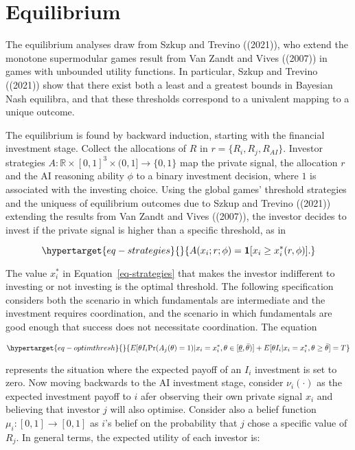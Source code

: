 \documentclass[
]{article}
\theoremstyle{plain}
\theoremstyle{definition}
\theoremstyle{remark}
\begin{document}
\hypertarget{equilibrium}{%
\section{Equilibrium}\label{equilibrium}}

The equilibrium analyses draw from Szkup and Trevino ((2021)), who
extend the monotone supermodular games result from Van Zandt and Vives
((2007)) in games with unbounded utility functions. In particular, Szkup
and Trevino ((2021)) show that there exist both a least and a greatest
bounds in Bayesian Nash equilibra, and that these thresholds correspond
to a univalent mapping to a unique outcome.

The equilibrium is found by backward induction, starting with the
financial investment stage. Collect the allocations of \(R\) in
\(r=\{R_i, R_j, R_{AI}\}\). Investor strategies
\(A : \mathbb{R} \times [0,1]^3 \times (0,1]\to \{0,1\}\) map the
private signal, the allocation \(r\) and the AI reasoning ability
\(\phi\) to a binary investment decision, where \(1\) is associated with
the investing choice. Using the global games' threshold strategies and
the uniquess of equilibrium outcomes due to Szkup and Trevino ((2021))
extending the results from Van Zandt and Vives ((2007)), the investor
decides to invest if the private signal is higher than a specific
threshold, as in

\begin{equation}\protect\hypertarget{eq-strategies}{}{
A(x_i;r;\phi) = \mathbf{1}[x_i \geq x_i^*(r, \phi)].
}\label{eq-strategies}\end{equation}

The value \(x_i^*\) in Equation~\ref{eq-strategies} that makes the
investor indifferent to investing or not investing is the optimal
threshold. The following specification considers both the scenario in
which fundamentals are intermediate and the investment requires
coordination, and the scenario in which fundamentals are good enough
that success does not necessitate coordination. The equation

\begin{equation}\protect\hypertarget{eq-optimthresh}{}{
E[\theta I_i \text{Pr}(A_j(\theta) = 1)|x_i = x_i^*, \theta \in [\underline{\theta}, \bar{\theta})] + E[\theta I_i|x_i = x_i^*, \theta \geq \bar{\theta}] = T
}\label{eq-optimthresh}\end{equation}

represents the situation where the expected payoff of an \(I_i\)
investment is set to zero. Now moving backwards to the AI investment
stage, consider \(\nu_i(\cdot)\) as the expected investment payoff to
\(i\) afer observing their own private signal \(x_i\) and believing that
investor \(j\) will also optimise. Consider also a belief function
\(\mu_i : [0, 1] \to [0, 1]\) as \(i\)'s belief on the probability that
\(j\) chose a specific value of \(R_j\). In general terms, the expected
utility of each investor is:
\end{document}
